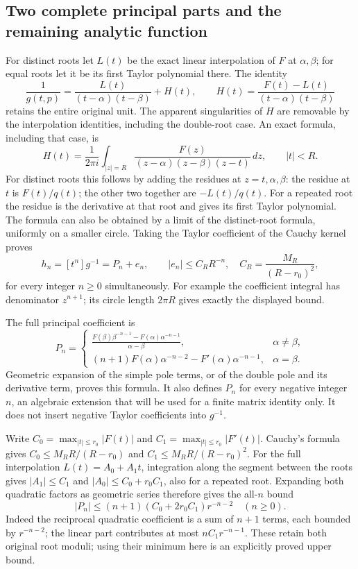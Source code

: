 \subsection{Two complete principal parts and the remaining analytic function}
For distinct roots let $L(t)$ be the exact linear interpolation of
$F$ at $\alpha,\beta$; for equal roots let it be its first Taylor
polynomial there.  The identity
\[
 \frac1{g(t,p)}=\frac{L(t)}{(t-\alpha)(t-\beta)}+H(t),\qquad
 H(t)=\frac{F(t)-L(t)}{(t-\alpha)(t-\beta)}
 \tag{RCM2}
\]
retains the entire original unit.  The apparent singularities of
$H$ are removable by the interpolation identities, including the
double-root case.  An exact formula, including that case, is
\[
 H(t)=\frac1{2\pi i}\int_{|z|=R}
       \frac{F(z)}{(z-\alpha)(z-\beta)(z-t)}\,dz,
 \qquad |t|<R.
 \tag{RCM3}
\]
For distinct roots this follows by adding the residues at
$z=t,\alpha,\beta$: the residue at $t$ is $F(t)/q(t)$;
the other two together are $-L(t)/q(t)$.  For a repeated root
the residue is the derivative at that root and gives its first
Taylor polynomial.  The formula can also be obtained by a limit
of the distinct-root formula, uniformly on a smaller circle.
Taking the Taylor coefficient of the Cauchy kernel proves
\[
 h_n=[t^n]g^{-1}=P_n+e_n,\qquad
 |e_n|\le C_R R^{-n},\quad C_R=\frac{M_R}{(R-r_0)^2},
 \tag{RCM4}
\]
for every integer $n\ge0$ simultaneously.  For example the
coefficient integral has denominator $z^{n+1}$; its circle length
$2\pi R$ gives exactly the displayed bound.

The full principal coefficient is
\[
 P_n=\begin{cases}
 \displaystyle\frac{F(\beta)\beta^{-n-1}-F(\alpha)\alpha^{-n-1}}
                         {\alpha-\beta},&\alpha\ne\beta,\\[6pt]
 \displaystyle (n+1)F(\alpha)\alpha^{-n-2}
                  -F'(\alpha)\alpha^{-n-1},&\alpha=\beta.
 \end{cases}
 \tag{RCM5}
\]
Geometric expansion of the simple pole terms, or of the double
pole and its derivative term, proves this formula.  It also
defines $P_n$ for every negative integer $n$, an algebraic
extension that will be used for a finite matrix identity only.
It does not insert negative Taylor coefficients into $g^{-1}$.

Write $C_0=\max_{|t|\le r_0}|F(t)|$ and
$C_1=\max_{|t|\le r_0}|F'(t)|$.  Cauchy's formula gives
$C_0\le M_R R/(R-r_0)$ and
$C_1\le M_R R/(R-r_0)^2$.
For the full interpolation $L(t)=A_0+A_1t$, integration along
the segment between the roots gives $|A_1|\le C_1$ and
$|A_0|\le C_0+r_0C_1$, also for a repeated root.
Expanding both quadratic factors as geometric series therefore
gives the all-$n$ bound
\[
 |P_n|\le(n+1)(C_0+2r_0C_1)r^{-n-2}\quad(n\ge0).
 \tag{RCM6}
\]
Indeed the reciprocal quadratic coefficient is a sum of $n+1$
terms, each bounded by $r^{-n-2}$; the linear part contributes
at most $nC_1r^{-n-1}$.  These retain both original root moduli;
using their minimum here is an explicitly proved upper bound.

